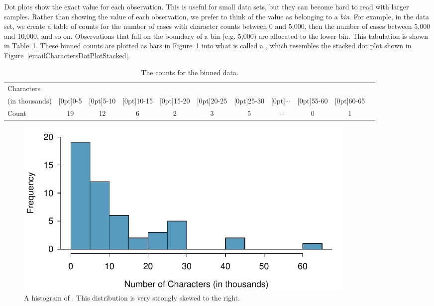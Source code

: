 \begin{doublespace}
Dot plots show the exact value for each observation. This is useful for small data sets, but they can become hard to read with larger samples. Rather than showing the value of each observation, we prefer to think of the value as belonging to a \emph{bin}. For example, in the  data set, we create a table of counts for the number of cases with character counts between 0 and 5,000, then the number of cases between 5,000 and 10,000, and so on. Observations that fall on the boundary of a bin (e.g. 5,000) are allocated to the lower bin. This tabulation is shown in Table~\ref{binnedNumCharTable}. These binned counts are plotted as bars in Figure~\ref{email50NumCharHist} into what is called a , which resembles the stacked dot plot shown in Figure~\ref{emailCharactersDotPlotStacked}.

\begin{table}[ht]
	\centering\small
	\begin{tabular}{l ccc ccc ccc c}
		\hline
		Characters & \\
		(in thousands) & \raisebox{1.5ex}[0pt]{0-5} & \raisebox{1.5ex}[0pt]{5-10} & \raisebox{1.5ex}[0pt]{10-15} & \raisebox{1.5ex}[0pt]{15-20} & \raisebox{1.5ex}[0pt]{20-25} & \raisebox{1.5ex}[0pt]{25-30} & \raisebox{1.5ex}[0pt]{$\cdots$} & \raisebox{1.5ex}[0pt]{55-60} & \raisebox{1.5ex}[0pt]{60-65} \\
		\hline
		Count & 19 & 12 & 6 & 2 & 3 & 5 & $\cdots$ & 0 & 1 \\
		\hline
	\end{tabular}
	\caption{The counts for the binned  data.}
	\label{binnedNumCharTable}
\end{table}

\begin{figure}[bth]
	\centering
	\includegraphics[width=0.82\textwidth]{ch_intro_to_data_oi_biostat/figures/email50NumCharHist/email50NumCharHist}
	\caption{A histogram of . This distribution is very strongly skewed to the right.}
	\label{email50NumCharHist}
\end{figure}


\end{doublespace}
